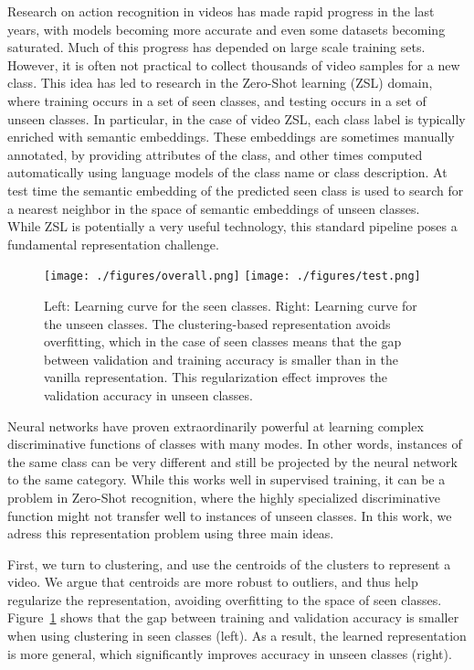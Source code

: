 \documentclass[runningheads]{llncs}
\begin{document}
Research on action recognition in videos has made rapid progress in the last years, with models becoming more accurate and even some datasets becoming saturated. Much of this progress has depended on large scale training sets. However, it is often not practical to collect thousands of video samples for a new class. This idea has led to research in the Zero-Shot learning (ZSL) domain, where training occurs in a set of seen classes, and testing occurs in a set of unseen classes. In particular, in the case of video ZSL, each class label is typically enriched with semantic embeddings. These embeddings are sometimes manually annotated, by providing attributes of the class, and other times computed automatically using language models of the class name or class description. At test time the semantic embedding of the predicted seen class is used to search for a nearest neighbor in the space of semantic embeddings of unseen classes. \\


While ZSL is potentially a very useful technology, this standard pipeline poses a fundamental representation challenge. \begin{figure}
    \centering
    \texttt{[image: ./figures/overall.png]}
    \texttt{[image: ./figures/test.png]}
    \caption{Left: Learning curve for the seen classes. Right: Learning curve for the unseen classes. The clustering-based representation avoids overfitting, which in the case of seen classes means that the gap between validation and training accuracy is smaller than in the vanilla representation. This regularization effect improves the validation accuracy in unseen classes. }
    \label{fig:seen_vs_unseen}
\end{figure}
Neural networks have proven extraordinarily powerful at learning complex discriminative functions of classes with many modes. In other words, instances of the same class can be very different and still be projected by the neural network to the same category. While this works well in supervised training, it can be a problem in Zero-Shot recognition, where the highly specialized discriminative function might not transfer well to instances of unseen classes. In this work, we adress this representation problem using three main ideas. 

First, we turn to clustering, and use the centroids of the clusters to  represent a video. We argue that centroids are more robust to outliers, and thus help regularize the representation, avoiding overfitting to the space of seen classes. Figure~\ref{fig:seen_vs_unseen} shows that the gap between training and validation accuracy is smaller when using clustering in seen classes (left). As a result, the learned representation is more general, which significantly improves accuracy in unseen classes (right). 
 
\end{document}
